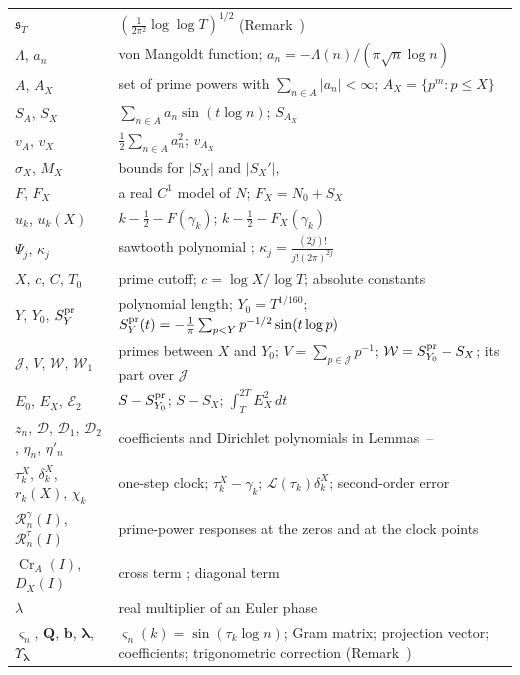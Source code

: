 \documentclass[preprint,12pt]{elsarticle}
\makeatletter
\let\CG@origref\ref
\let\CG@origeqref\eqref
\newcommand{\CG@gettip}[1]{\@ifundefined{CGTip@#1}{Reference: #1}{\csname CGTip@#1\endcsname}}
\DeclareRobustCommand{\CGref}[1]{\pdftooltip{\CG@origref{#1}}{\CG@gettip{#1}}}
\DeclareRobustCommand{\CGeqref}[1]{\pdftooltip{\CG@origeqref{#1}}{\CG@gettip{#1}}}
\numberwithin{equation}{section}
\theoremstyle{plain}
\theoremstyle{definition}
\theoremstyle{remark}
\newcommand{\NO}{N_0}
\newcommand{\lL}{\mathcal L}
\newcommand{\Cr}{\operatorname{Cr}}
\newcommand{\Rg}{\mathcal R^{\gamma}}
\newcommand{\Rt}{\mathcal R^{\tau}}
\makeatother
\begin{document}
\begin{center}
\begin{longtable}{p{}p{}}
$\mathfrak s_T$ & $(\frac1{2\pi^2}\log\log T)^{1/2}$ (Remark~\CGref{rem:korolev})\\
$\Lambda$, $a_n$ & von Mangoldt function; $a_n=-\Lambda(n)/(\pi\sqrt n\log n)$\\
$A$, $A_X$ & set of prime powers with $\sum_{n\in A}|a_n|<\infty$; $A_X=\{p^m:p\le X\}$\\
$S_A$, $S_X$ & $\sum_{n\in A}a_n\sin(t\log n)$; $S_{A_X}$\\
$v_A$, $v_X$ & $\frac12\sum_{n\in A}a_n^2$; $v_{A_X}$\\
$\sigma_X$, $M_X$ & bounds for $|S_X|$ and $|S_X'|$, \CGeqref{eq:sigma_M_def}\\
$F$, $F_X$ & a real $C^1$ model of $N$; $F_X=\NO+S_X$\\
$u_k$, $u_k(X)$ & $k-\frac12-F(\gamma_k)$; $k-\frac12-F_X(\gamma_k)$\\
$\Psi_j$, $\kappa_j$ & sawtooth polynomial \CGeqref{eq:Psi_def}; $\kappa_j=\frac{(2j)!}{j!(2\pi)^{2j}}$\\
$X$, $c$, $C$, $T_0$ & prime cutoff; $c=\log X/\log T$; absolute constants\\
$Y$, $Y_0$, $S^{\rm pr}_Y$ & polynomial length; $Y_0=T^{1/160}$; $S^{\rm pr}_Y(t)=-\frac1\pi\sum_{p<Y}p^{-1/2}\sin(t\log p)$\\
$\mathcal J$, $V$, $\mathcal W$, $\mathcal W_1$ & primes between $X$ and $Y_0$; $V=\sum_{p\in\mathcal J}p^{-1}$; $\mathcal W=S^{\rm pr}_{Y_0}-S_X$; its part over $\mathcal J$ \CGeqref{eq:D_def}\\
$E_0$, $E_X$, $\mathcal E_2$ & $S-S^{\rm pr}_{Y_0}$; $S-S_X$; $\int_T^{2T}E_X^2\,dt$\\
$z_n$, $\mathcal D$, $\mathcal D_1$, $\mathcal D_2$, $\eta_n$, $\eta'_n$ & coefficients and Dirichlet polynomials in Lemmas~\CGref{lem:trig_MV}--\CGref{lem:D_moments}\\
$\tau_k^X$, $\delta_k^X$, $r_k(X)$, $\chi_k$ & one-step clock; $\tau_k^X-\gamma_k$; $\lL(\tau_k)\delta_k^X$; second-order error \CGeqref{eq:one_step_decomposition}\\
$\Rg_n(I)$, $\Rt_n(I)$ & prime-power responses at the zeros and at the clock points \CGeqref{eq:two_responses}\\
$\Cr_A(I)$, $D_X(I)$ & cross term \CGeqref{eq:Cr_def}; diagonal term \CGeqref{eq:full_factor_gain}\\
$\lambda$ & real multiplier of an Euler phase\\
$\varsigma_n$, $\mathbf Q$, $\mathbf b$, $\boldsymbol\lambda$, $\Upsilon_{\boldsymbol\lambda}$ & $\varsigma_n(k)=\sin(\tau_k\log n)$; Gram matrix; projection vector; coefficients; trigonometric correction (Remark~\CGref{rem:matrix_projection})\\

\end{longtable}
\end{center}
\end{document}
